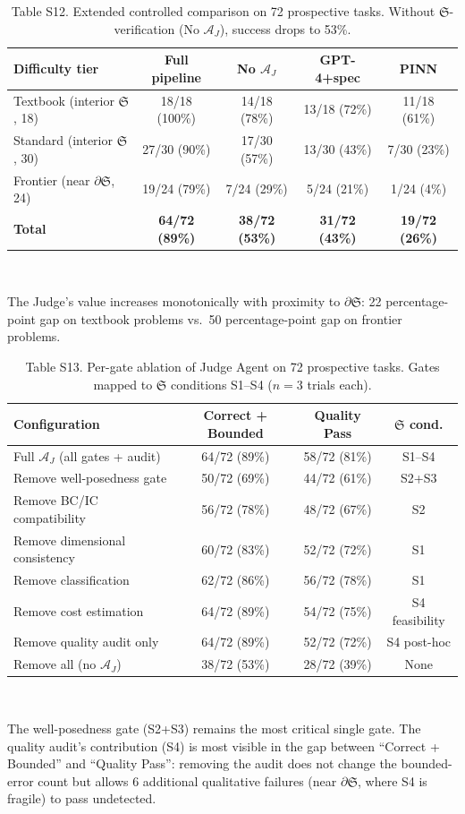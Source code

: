 \documentclass[11pt,a4paper]{article}
\newcommand{\Sclass}{\mathfrak{S}}
\newcommand{\Agent}{\mathcal{A}}
\begin{document}
\begin{table}[htbp]
\centering
\caption{Table S12. Extended controlled comparison on 72 prospective tasks. Without $\Sclass$-verification (No $\Agent_J$), success drops to 53\%.}
\small
\begin{tabularx}{\textwidth}{Xcccc}
\toprule
\textbf{Difficulty tier} & \textbf{Full pipeline} & \textbf{No $\Agent_J$} & \textbf{GPT-4+spec} & \textbf{PINN} \\
\midrule
Textbook (interior $\Sclass$, 18) & 18/18 (100\%) & 14/18 (78\%) & 13/18 (72\%) & 11/18 (61\%) \\
Standard (interior $\Sclass$, 30) & 27/30 (90\%) & 17/30 (57\%) & 13/30 (43\%) & 7/30 (23\%) \\
Frontier (near $\partial \Sclass$, 24) & 19/24 (79\%) & 7/24 (29\%) & 5/24 (21\%) & 1/24 (4\%) \\
\midrule
\textbf{Total} & \textbf{64/72 (89\%)} & \textbf{38/72 (53\%)} & \textbf{31/72 (43\%)} & \textbf{19/72 (26\%)} \\
\bottomrule
\end{tabularx}\\[3pt]
\raggedright\scriptsize The Judge's value increases monotonically with proximity to $\partial \Sclass$: 22 percentage-point gap on textbook problems vs.\ 50 percentage-point gap on frontier problems.
\end{table}

\begin{table}[htbp]
\centering
\caption{Table S13. Per-gate ablation of Judge Agent on 72 prospective tasks. Gates mapped to $\Sclass$ conditions S1--S4 ($n = 3$ trials each).}
\small
\begin{tabularx}{\textwidth}{Xccc}
\toprule
\textbf{Configuration} & \textbf{Correct + Bounded} & \textbf{Quality Pass} & \textbf{$\Sclass$ cond.} \\
\midrule
Full $\Agent_J$ (all gates + audit) & 64/72 (89\%) & 58/72 (81\%) & S1--S4 \\
Remove well-posedness gate & 50/72 (69\%) & 44/72 (61\%) & S2+S3 \\
Remove BC/IC compatibility & 56/72 (78\%) & 48/72 (67\%) & S2 \\
Remove dimensional consistency & 60/72 (83\%) & 52/72 (72\%) & S1 \\
Remove classification & 62/72 (86\%) & 56/72 (78\%) & S1 \\
Remove cost estimation & 64/72 (89\%) & 54/72 (75\%) & S4 feasibility \\
Remove quality audit only & 64/72 (89\%) & 52/72 (72\%) & S4 post-hoc \\
Remove all (no $\Agent_J$) & 38/72 (53\%) & 28/72 (39\%) & None \\
\bottomrule
\end{tabularx}\\[3pt]
\raggedright\scriptsize The well-posedness gate (S2+S3) remains the most critical single gate. The quality audit's contribution (S4) is most visible in the gap between ``Correct + Bounded'' and ``Quality Pass'': removing the audit does not change the bounded-error count but allows 6 additional qualitative failures (near $\partial \Sclass$, where S4 is fragile) to pass undetected.
\end{table}
\end{document}
